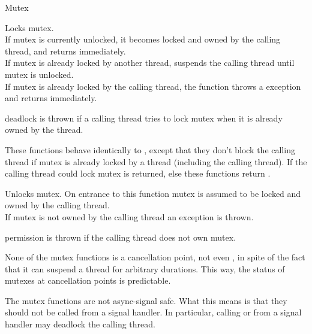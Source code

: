 \begin{classpage}{Mutex}
\begin{mandescription}
  Locks  mutex.\\
  If  mutex is currently unlocked, it becomes locked and
  owned by the calling thread, and  returns
  immediately.\\
  If  mutex is already locked by another thread,
   suspends the calling thread until  mutex is
  unlocked.\\
  If  mutex is already locked by the calling thread, the
  function throws a  exception and returns immediately.
  \begin{exception}
    \item[deadlock] is thrown if a calling thread tries to lock
     mutex when it is already owned by the thread.    
  \end{exception}

  These functions behave identically to , except
  that they don't block the calling thread if  mutex is
  already locked by a thread (including the calling thread). If the
  calling thread could lock  mutex  is returned,
  else these functions return .

  Unlocks  mutex. On entrance to this function 
  mutex is assumed to be locked and owned by the calling
  thread.\\
  If  mutex is not owned by the calling thread an
   exception is thrown.
  \begin{exception}
    \item[permission] is thrown if the calling thread does not own
     mutex.
  \end{exception}
\end{mandescription}

  None of the mutex functions is a cancellation point, not even
  , in spite of the fact that it can suspend a
  thread for arbitrary durations. This way, the status of mutexes at
  cancellation points is predictable.

  The mutex functions are not async-signal safe. What this means is
  that they should not be called from a signal handler. In particular,
  calling  or  from a signal
  handler may deadlock the calling thread.

\end{classpage}
